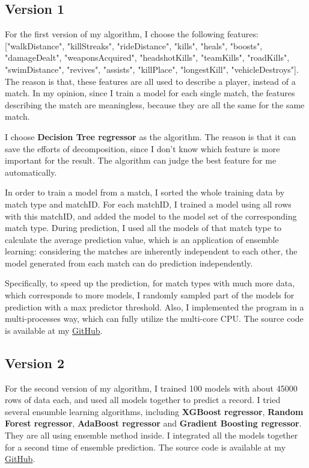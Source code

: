 \documentclass[journal=jacsat,manuscript=article]{achemso}
\begin{document}
\subsection{Version 1}

For the first version of my algorithm, I choose the following features: ["walkDistance",
"killStreaks", "rideDistance", "kills", "heals", "boosts", "damageDealt", "weaponsAcquired",
"headshotKills", "teamKills", "roadKills", "swimDistance", "revives", "assists", "killPlace",
"longestKill", "vehicleDestroys"]. The reason is that, these features are all used to describe a 
player, instead of a match. In my opinion, since I train a model for each single match,
the features describing the match are meaningless, because they are all the same for the same match.

I choose \textbf{Decision Tree regressor} as the algorithm. The reason is that it can 
save the efforts of decomposition, since I don't know which feature is more important for 
the result. The algorithm can judge the best feature for me automatically.

In order to train a model from a match, I sorted the whole training data by match type and matchID.
For each matchID, I trained a model using all rows with this matchID, and added the model to the 
model set of the corresponding match type. During prediction, I used all the models of that match type 
to calculate the average prediction value, which is an application of ensemble learning: considering
the matches are inherently independent to each other, the model generated from each match 
can do prediction independently.

Specifically, to speed up the prediction, for match types with much more data, which corresponds
to more models, I randomly sampled part of the models for prediction with a max predictor threshold.
Also, I implemented the program in a multi-processes way, 
which can fully utilize the multi-core CPU. The source code is available at my
\href{https://github.com/mrdrivingduck/pugb-finish-placement-prediction/blob/master/src/main_multi_process_version.py}{GitHub}.

\subsection{Version 2}

For the second version of my algorithm, I trained 100 models with about 45000 rows of data each,
and used all models together to predict a record. I tried several ensumble learning algorithms,
including \textbf{XGBoost regressor}, \textbf{Random Forest regressor}, \textbf{AdaBoost regressor}
and \textbf{Gradient Boosting regressor}. They are all using ensemble method inside.
I integrated all the models together for a second time of ensemble prediction.
The source code is available at my
\href{https://github.com/mrdrivingduck/pugb-finish-placement-prediction/blob/master/src/main_ensemble.py}{GitHub}.
\end{document}
